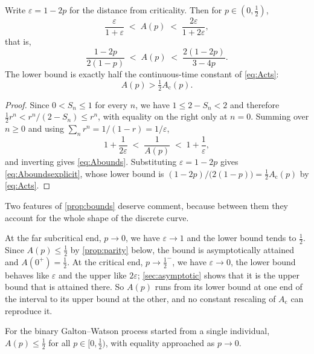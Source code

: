 \begin{proposition}
\label{prop:bounds}
Write $\varepsilon = 1-2p$ for the distance from criticality. Then for
$p\in(0,\tfrac12)$,
\begin{equation}
\label{eq:Abounds}
\frac{\varepsilon}{1+\varepsilon} \;<\; A(p) \;<\; \frac{2\varepsilon}{1+2\varepsilon},
\end{equation}
that is,
\begin{equation}
\label{eq:Aboundsexplicit}
\frac{1-2p}{2(1-p)} \;<\; A(p) \;<\; \frac{2(1-2p)}{3-4p} .
\end{equation}
The lower bound is exactly half the continuous-time constant of \cref{eq:Acts}:
\begin{equation}
\label{eq:halfAc}
A(p) > \tfrac12 A_{\text{c}}(p) .
\end{equation}
\end{proposition}

\begin{proof}
Since $0<S_n\le1$ for every $n$, we have $1\le 2-S_n<2$ and therefore
$\tfrac12 r^n < r^n/(2-S_n)\le r^n$, with equality on the right only at $n=0$. Summing
over $n\ge0$ and using $\sum_n r^n = 1/(1-r) = 1/\varepsilon$,
\begin{equation*}
1+\frac{1}{2\varepsilon} \;<\; \frac{1}{A(p)} \;<\; 1+\frac{1}{\varepsilon},
\end{equation*}
and inverting gives \cref{eq:Abounds}. Substituting $\varepsilon=1-2p$ gives
\cref{eq:Aboundsexplicit}, whose lower bound is $(1-2p)/\bigl(2(1-p)\bigr)
= \tfrac12A_{\text{c}}(p)$ by \cref{eq:Acts}.
\end{proof}

Two features of \cref{prop:bounds} deserve comment, because between them they account for
the whole shape of the discrete curve.

At the far subcritical end, $p\to0$, we have $\varepsilon\to1$ and the lower bound tends
to $\tfrac12$. Since $A(p)\le\tfrac12$ by \cref{prop:parity} below, the bound is
asymptotically attained and $A(0^+)=\tfrac12$. At the critical end, $p\to\tfrac12^-$, we
have $\varepsilon\to0$, the lower bound behaves like $\varepsilon$ and the upper like
$2\varepsilon$; \cref{sec:asymptotic} shows that it is the upper bound that is attained
there. So $A(p)$ runs from its lower bound at one end of the interval to its upper bound
at the other, and no constant rescaling of $A_{\text{c}}$ can reproduce it.

\begin{proposition}
\label{prop:parity}
For the binary Galton--Watson process started from a single individual,
$A(p)\le\tfrac12$ for all $p\in[0,\tfrac12)$, with equality approached as $p\to0$.
\end{proposition}

